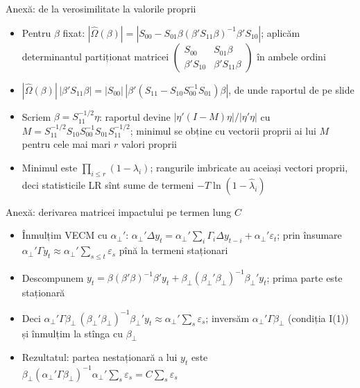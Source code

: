 \begin{frame}{Anexă: de la verosimilitate la valorile proprii}
\hypertarget{atsapp1}{}
\itemsize{\small}
\begin{itemize}
    \item Pentru $\beta$ fixat: $|\hat\Omega(\beta)| = |S_{00} - S_{01}\beta(\beta'S_{11}\beta)^{-1}\beta'S_{10}|$; aplicăm determinantul partiționat matricei $\begin{pmatrix}S_{00} & S_{01}\beta\\ \beta'S_{10} & \beta'S_{11}\beta\end{pmatrix}$ în ambele ordini
    \item $|\hat\Omega(\beta)|\,|\beta'S_{11}\beta| = |S_{00}|\,|\beta'(S_{11} - S_{10}S_{00}^{-1}S_{01})\beta|$, de unde raportul de pe slide
    \item Scriem $\beta = S_{11}^{-1/2}\eta$: raportul devine $|\eta'(I - M)\eta|/|\eta'\eta|$ cu $M = S_{11}^{-1/2}S_{10}S_{00}^{-1}S_{01}S_{11}^{-1/2}$; minimul se obține cu vectorii proprii ai lui $M$ pentru cele mai mari $r$ valori proprii
    \item Minimul este $\prod_{i\le r}(1 - \lambda_i)$; rangurile imbricate au aceiași vectori proprii, deci statisticile LR sînt sume de termeni $-T\ln(1 - \hat\lambda_i)$
\end{itemize}
\end{frame}

\begin{frame}{Anexă: derivarea matricei impactului pe termen lung $C$}
\hypertarget{atsapp2}{}
\itemsize{\small}
\begin{itemize}
    \item Înmulțim VECM cu $\alpha_\perp'$: $\alpha_\perp'\Delta y_t = \alpha_\perp'\sum_i\Gamma_i\Delta y_{t-i} + \alpha_\perp'\varepsilon_t$; prin însumare $\alpha_\perp'\Gamma y_t \approx \alpha_\perp'\sum_{s\le t}\varepsilon_s$ pînă la termeni staționari
    \item Descompunem $y_t = \beta(\beta'\beta)^{-1}\beta'y_t + \beta_\perp(\beta_\perp'\beta_\perp)^{-1}\beta_\perp'y_t$; prima parte este staționară
    \item Deci $\alpha_\perp'\Gamma\beta_\perp\,(\beta_\perp'\beta_\perp)^{-1}\beta_\perp'y_t \approx \alpha_\perp'\sum_s\varepsilon_s$; inversăm $\alpha_\perp'\Gamma\beta_\perp$ (condiția I(1)) și înmulțim la stînga cu $\beta_\perp$
    \item Rezultatul: partea nestaționară a lui $y_t$ este $\beta_\perp(\alpha_\perp'\Gamma\beta_\perp)^{-1}\alpha_\perp'\sum_s\varepsilon_s = C\sum_s\varepsilon_s$
\end{itemize}
\end{frame}


